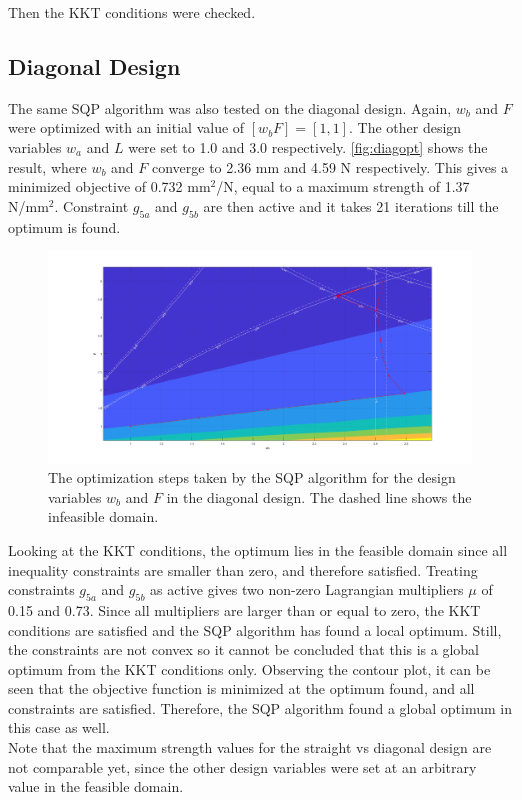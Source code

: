 Then the KKT conditions were checked. 
\subsection{Diagonal Design}
The same SQP algorithm was also tested on the diagonal design. Again, $w_b$ and $F$ were optimized with an initial value of $[w_b F] = [1, 1]$. The other design variables $w_a$ and $L$ were set to 1.0 and 3.0 respectively. \autoref{fig:diagopt} shows the result, where $w_b$ and $F$ converge to 2.36 mm and 4.59 N respectively. This gives a minimized objective of 0.732 mm$^2$/N, equal to a maximum strength of 1.37 N/mm$^2$. Constraint $g_{5a}$ and $g_{5b}$ are then active and it takes 21 iterations till the optimum is found.


\begin{figure}[H]
	\centering
	\includegraphics[width=\columnwidth]{sources/plots/diagonal2var.png}
	\caption{The optimization steps taken by the SQP algorithm for the design variables $w_b$ and $F$ in the diagonal design. The dashed line shows the infeasible domain.}
	\label{fig:diagopt}
\end{figure}

Looking at the KKT conditions, the optimum lies in the feasible domain since all inequality constraints are smaller than zero, and therefore satisfied. Treating constraints $g_{5a}$ and $g_{5b}$ as active gives two non-zero Lagrangian multipliers $\mu$ of 0.15 and 0.73. Since all multipliers are larger than or equal to zero, the KKT conditions are satisfied and the SQP algorithm has found a local optimum. Still, the constraints are not convex so it cannot be concluded that this is a global optimum from the KKT conditions only. Observing the contour plot, it can be seen that the objective function is minimized at the optimum found, and all constraints are satisfied. Therefore, the SQP algorithm found a global optimum in this case as well.\\

Note that the maximum strength values for the straight vs diagonal design are not comparable yet, since the other design variables were set at an arbitrary value in the feasible domain.








